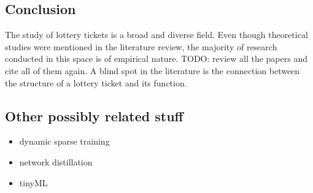 \subsection{Conclusion}
The study of lottery tickets is a broad and diverse field. Even though theoretical studies were mentioned in the literature review, the majority of research conducted in this space is of empirical nature.
TODO: review all the papers and cite all of them again.
A blind spot in the literature is the connection between the structure of a lottery ticket and its function. 

\subsection{Other possibly related stuff}
\begin{itemize}
    \item dynamic sparse training
    \item network distillation
    \item tinyML
\end{itemize}





